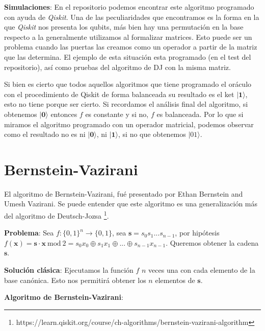 \textbf{Simulaciones}: En el repositorio podemos encontrar este algoritmo programado con ayuda de \textit{Qiskit}. Una de las peculiaridades que encontramos es la forma en la que \textit{Qiskit} nos presenta los qubits, más bien hay una permutación en la base respecto a la generalmente utilizamos al formalizar matrices. Esto puede ser un problema cuando las puertas las creamos como un operador a partir de la matriz que las determina. El ejemplo de esta situación esta programado (en el test del repositorio), así como pruebas del algoritmo de DJ con la misma matriz. \newline

Si bien es cierto que todos aquellos algoritmos que tiene programado el oráculo con el procedimiento de Qiskit de forma balanceada su resultado es el ket $|\mathbf{1}\rangle$, esto no tiene porque ser cierto. Si recordamos el análisis final del algoritmo, si obtenemos $|\textbf{0}\rangle$ entonces $f$ es constante y si no, $f$ es balanceada. Por lo que si miramos el algoritmo programado con un operador matricial, podemos observar como el resultado no es ni $|\textbf{0}\rangle$, ni $|\textbf{1}\rangle$, si no que obtenemos $|01\rangle$.


\section{Bernstein-Vazirani}
\label{Sec3.4:BV}

El algoritmo de Bernstein-Vazirani, fué presentado por Ethan Bernstein and Umesh Vazirani\cite{AR:BV:1997}. Se puede entender que este algoritmo es una generalización más del algoritmo de Deutsch-Jozsa \footnote{https://learn.qiskit.org/course/ch-algorithms/bernstein-vazirani-algorithm}. \newline

\textbf{Problema}: Sea $f:\{0,1\}^{n} \rightarrow \{0,1\}$, sea $\mathbf{s}=s_{0}s_{1}...s_{n-1}$, por hipótesis $f(\mathbf{x})=\mathbf{s}\cdot \mathbf{x}\: \text{mod}\:2 = s_{0}x_{0} \oplus s_{1}x_{1} \oplus ... \oplus s_{n-1}x_{n-1}$. Queremos obtener la cadena $\mathbf{s}$.\newline

\textbf{Solución clásica}: Ejecutamos la función $f$ $n$ veces una con cada elemento de la base canónica. Esto nos permitirá obtener los $n$ elementos de $\mathbf{s}$.\newline

\textbf{Algoritmo de Bernstein-Vazirani}:

 \vspace{10pt}

